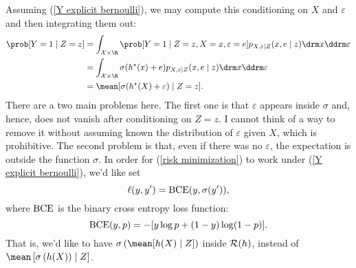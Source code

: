 Assuming (\ref{Y explicit bernoulli}), we may compute this conditioning on $ X $ and $ \varepsilon $ and then integrating them out:
\begin{align*}
    \prob [ Y = 1 \mid Z = z ]
    &= \int_{ \mathcal{X} \times \R } \prob [ Y = 1 \mid Z = z, X = x, \varepsilon = e ] p_{ X, \varepsilon \mid Z } ( x, e \mid z ) \drm x \ddrm \varepsilon \\
    &= \int_{ \mathcal{X} \times \R } \sigma ( \hstar ( x ) + e ) p_{ X, \varepsilon \mid Z } ( x, e \mid z ) \drm x \ddrm \varepsilon \\
    &= \mean [ \sigma ( \hstar ( X ) + \varepsilon ) \mid Z = z ]
.\end{align*}
There are a two main problems here.
The first one is that $ \varepsilon $ appears inside $ \sigma $ and, hence, does not vanish after conditioning on $ Z = z $.
I cannot think of a way to remove it without assuming known the distribution of $ \varepsilon $ given $ X $, which is prohibitive.
The second problem is that, even if there was no $ \varepsilon $, the expectation is outside the function $ \sigma $.
In order for (\ref{risk minimization}) to work under (\ref{Y explicit bernoulli}), we'd like set
\begin{equation*}
    \ell ( y, y' ) = \operatorname{BCE} ( y, \sigma ( y' ) )
,\end{equation*}
where $ \operatorname{BCE} $ is the binary cross entropy loss function:
\begin{equation*}
    \operatorname{BCE} ( y, p ) = - [ y \log p + ( 1 - y ) \log ( 1 - p ) ]
.\end{equation*}
That is, we'd like to have $ \sigma \left( \mean [ h ( X ) \mid Z ] \right) $ inside $ \mathcal{R} ( h ) $, instead of $ \mean \left[ \sigma \left( h ( X ) \right) \mid Z \right] $.

